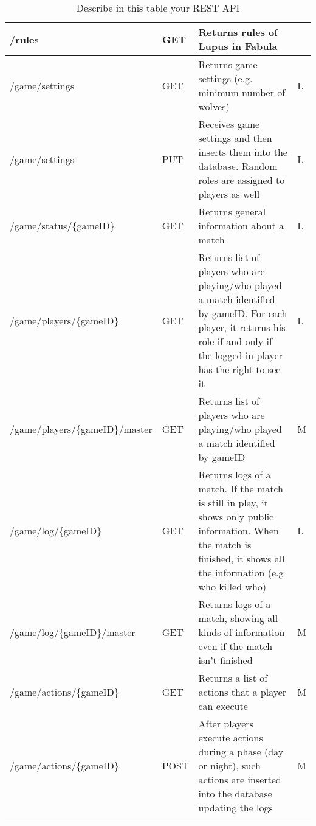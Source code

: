 \begin{longtable}{|p{}|p{} |p{}|p{}|}
/rules & GET & Returns rules of Lupus in Fabula &  \\\hline

/game/settings & GET & Returns game settings (e.g. minimum number of wolves) & L \\\hline
/game/settings & PUT & Receives game settings and then inserts them into the database. Random roles are assigned to players as well & L \\\hline
/game/status/\{gameID\} & GET & Returns general information about a match & L \\\hline

/game/players/\{gameID\}& GET & Returns list of players who are playing/who played a match identified by gameID. For each player, it returns his role if and only if the logged in player has the right to see it & L \\\hline
/game/players/\{gameID\}/master & GET & Returns list of players who are playing/who played a match identified by gameID & M \\\hline

/game/log/\{gameID\} & GET & Returns logs of a match. If the match is still in play, it shows only public information. When the match is finished, it shows all the information (e.g who killed who) & L \\\hline
/game/log/\{gameID\}/master & GET & Returns logs of a match, showing all kinds of information even if the match isn't finished & M \\\hline


/game/actions/\{gameID\} & GET & Returns a list of actions that a player can execute & M \\\hline
/game/actions/\{gameID\} & POST & After players execute actions during a phase (day or night), such actions are inserted into the database updating the logs & M \\\hline

\caption{Describe in this table your REST API}
\label{tab:termGlossary}
\end{longtable}
